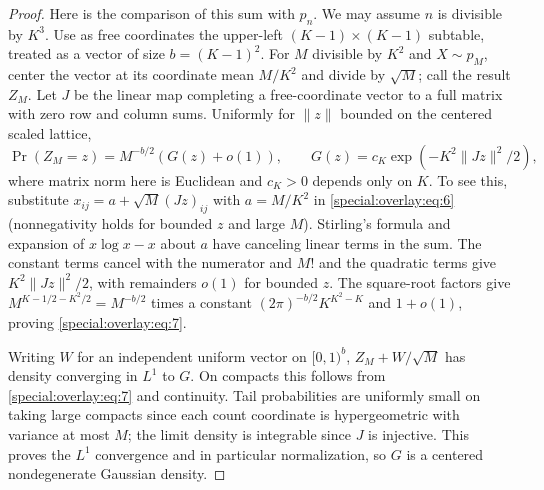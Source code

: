 \begin{proof}
Here is the comparison of this sum with \(p_n\). We may assume \(n\) is divisible by \(K^3\). Use as free coordinates the upper-left \((K-1)\times(K-1)\) subtable, treated as a vector of size \(b=(K-1)^2\). For \(M\) divisible by \(K^2\) and \(X\sim p_M\), center the vector at its coordinate mean \(M/K^2\) and divide by \(\sqrt M\); call the result \(Z_M\). Let \(J\) be the linear map completing a free-coordinate vector to a full matrix with zero row and column sums. Uniformly for \(\|z\|\) bounded on the centered scaled lattice,
\begin{equation}
 \Pr(Z_M=z)=M^{-b/2}
   \left(G(z)+o(1)\right),\qquad
 G(z)=c_K \exp\!\left(-K^2\|J z\|^2/2\right),                           \label{special:overlay:eq:7}
\end{equation}
where matrix norm here is Euclidean and \(c_K>0\) depends only on \(K\). To see this, substitute \(x_{ij}=a+\sqrt M (Jz)_{ij}\) with \(a=M/K^2\) in \eqref{special:overlay:eq:6} (nonnegativity holds for bounded \(z\) and large \(M\)). Stirling's formula and expansion of \(x\log x-x\) about \(a\) have canceling linear terms in the sum. The constant terms cancel with the numerator and \(M!\) and the quadratic terms give \(K^2\|Jz\|^2/2\), with remainders \(o(1)\) for bounded \(z\). The square-root factors give \(M^{K-1/2-K^2/2}=M^{-b/2}\) times a constant \((2\pi)^{-b/2}K^{K^2-K}\) and \(1+o(1)\), proving \eqref{special:overlay:eq:7}.

Writing \(W\) for an independent uniform vector on \([0,1)^b\), \(Z_M+W/\sqrt M\) has density converging in \(L^1\) to \(G\). On compacts this follows from \eqref{special:overlay:eq:7} and continuity. Tail probabilities are uniformly small on taking large compacts since each count coordinate is hypergeometric with variance at most \(M\); the limit density is integrable since \(J\) is injective. This proves the \(L^1\) convergence and in particular normalization, so \(G\) is a centered nondegenerate Gaussian density.


\end{proof}

